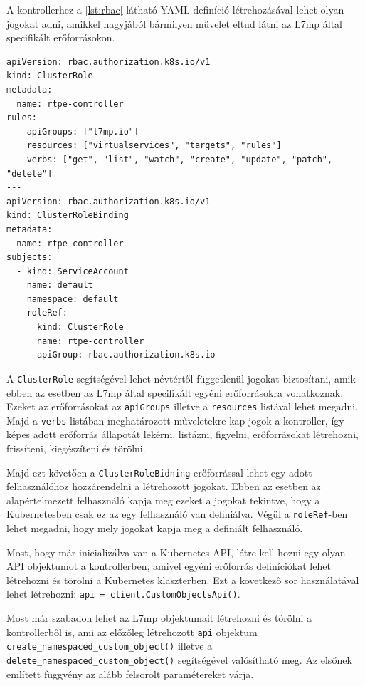 A kontrollerhez a \ref{lst:rbac} látható YAML definíció létrehozásával lehet olyan jogokat
adni, amikkel nagyjából bármilyen művelet eltud látni az L7mp által specifikált 
erőforrásokon.

\begin{lstlisting}[caption=RBAC létrehozása, label=lst:rbac]
apiVersion: rbac.authorization.k8s.io/v1
kind: ClusterRole
metadata:
  name: rtpe-controller
rules:
  - apiGroups: ["l7mp.io"]
    resources: ["virtualservices", "targets", "rules"]
    verbs: ["get", "list", "watch", "create", "update", "patch", "delete"]
---
apiVersion: rbac.authorization.k8s.io/v1
kind: ClusterRoleBinding
metadata:
  name: rtpe-controller
subjects:
  - kind: ServiceAccount
    name: default
    namespace: default
    roleRef:
      kind: ClusterRole
      name: rtpe-controller
      apiGroup: rbac.authorization.k8s.io
\end{lstlisting}

A \texttt{ClusterRole} segítségével lehet névtértől függetlenül jogokat biztosítani,
amik ebben az esetben az L7mp által specifikált egyéni erőforrásokra vonatkoznak. 
Ezeket az erőforrásokat az \texttt{apiGroups} illetve a \texttt{resources} listával
lehet megadni. Majd a \texttt{verbs} listában meghatározott műveletekre kap 
jogok a kontroller, így képes adott erőforrás állapotát lekérni, listázni, figyelni,
erőforrásokat létrehozni, frissíteni, kiegészíteni és törölni. 

Majd ezt követően a \texttt{ClusterRoleBidning} erőforrással lehet egy adott
felhasználóhoz hozzárendelni a létrehozott jogokat. Ebben az esetben az alapértelmezett
felhasználó kapja meg ezeket a jogokat tekintve, hogy a Kubernetesben csak ez az egy
felhasználó van definiálva. Végül a \texttt{roleRef}-ben lehet megadni, hogy mely
jogokat kapja meg a definiált felhasználó. 

Most, hogy már inicializálva van a Kubernetes API, létre kell hozni egy olyan 
API objektumot a kontrollerben, amivel egyéni erőforrás definíciókat lehet létrehozni
és törölni a Kubernetes klaszterben. Ezt a következő sor használatával lehet létrehozni: 
\texttt{api = client.CustomObjectsApi()}.

Most már szabadon lehet az L7mp objektumait létrehozni és törölni a kontrollerből is, 
ami az előzőleg létrehozott \texttt{api} objektum 
\texttt{create\_namespaced\_custom\_object()} illetve a 
\texttt{delete\_namespaced\_custom\_object()} segítségével valósítható meg. Az elsőnek 
említett függvény az alább felsorolt paramétereket várja.

